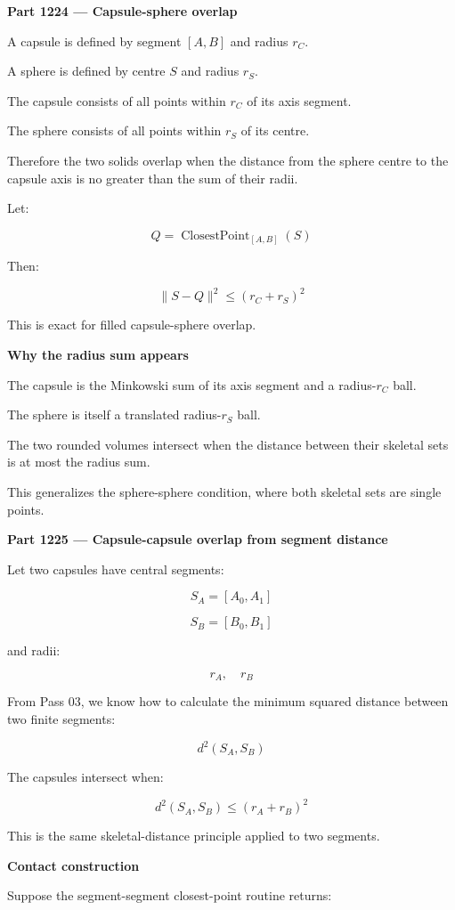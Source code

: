 \textbf{Part 1224 --- Capsule-sphere overlap}

A capsule is defined by segment \([A,B]\) and radius \(r_C\).

A sphere is defined by centre \(S\) and radius \(r_S\).

The capsule consists of all points within \(r_C\) of its axis segment.

The sphere consists of all points within \(r_S\) of its centre.

Therefore the two solids overlap when the distance from the sphere centre to the capsule axis is no greater than the sum of their radii.

Let:

\[
Q=\operatorname{ClosestPoint}_{[A,B]}(S)
\]

Then:

\[
\boxed{ \|S-Q\|^2\le(r_C+r_S)^2 }
\]

This is exact for filled capsule-sphere overlap.

\textbf{Why the radius sum appears}

The capsule is the Minkowski sum of its axis segment and a radius-\(r_C\) ball.

The sphere is itself a translated radius-\(r_S\) ball.

The two rounded volumes intersect when the distance between their skeletal sets is at most the radius sum.

This generalizes the sphere-sphere condition, where both skeletal sets are single points.

\textbf{Part 1225 --- Capsule-capsule overlap from segment distance}

Let two capsules have central segments:

\[
S_A=[A_0,A_1]
\]

\[
S_B=[B_0,B_1]
\]

and radii:

\[
r_A,\quad r_B
\]

From Pass 03, we know how to calculate the minimum squared distance between two finite segments:

\[
d^2(S_A,S_B)
\]

The capsules intersect when:

\[
\boxed{ d^2(S_A,S_B)\le(r_A+r_B)^2 }
\]

This is the same skeletal-distance principle applied to two segments.

\textbf{Contact construction}

Suppose the segment-segment closest-point routine returns:

